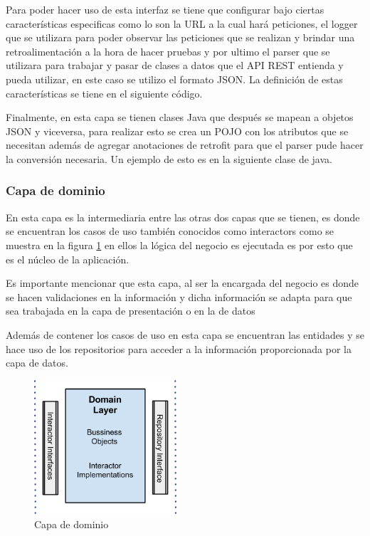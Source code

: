 

Para poder hacer uso de esta interfaz se tiene que configurar bajo ciertas características especificas como lo son la URL a la cual hará peticiones, el logger que se utilizara para poder observar las peticiones que se realizan y brindar una retroalimentación a la hora de hacer pruebas y por ultimo el parser que se utilizara para trabajar y pasar de clases a datos que el API REST entienda y pueda utilizar, en este caso se utilizo el formato JSON. La definición de estas características se tiene en el siguiente código.



Finalmente, en esta capa se tienen clases Java que después se mapean a objetos JSON y viceversa, para realizar esto se crea un POJO con los atributos que se necesitan además de agregar anotaciones de retrofit para que el parser pude hacer la conversión necesaria. Un ejemplo de esto es en la siguiente clase de java.




\subsubsection{Capa de dominio}
En esta capa es la intermediaria entre las otras dos capas que se tienen, es donde se encuentran los casos de uso también conocidos como interactors como se muestra en la figura \ref{fig:capa-dominio} en ellos la lógica del negocio es ejecutada es por esto que es el núcleo de la aplicación.

Es importante mencionar que esta capa, al ser la encargada del negocio es donde se hacen validaciones en la información y dicha información se adapta para que sea trabajada en la capa de presentación o en la de datos

Además de contener los casos de uso en esta capa se encuentran las entidades y se hace uso de los repositorios para acceder a la información proporcionada por la capa de datos.

\begin{figure}[h]
    \centering
    \includegraphics[width=200px]{capitulo5/android/img/capa-dominio.png}
    \caption{Capa de dominio \cite{cleanWay}}
    \label{fig:capa-dominio}
\end{figure}

